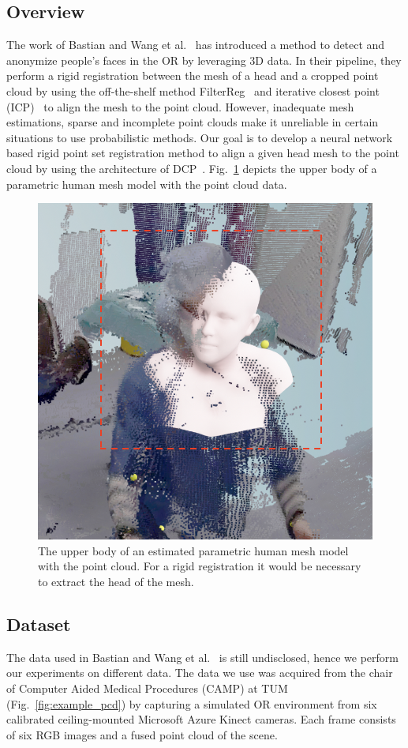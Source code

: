 \documentclass[a4paper,pagesize 10pt]{scrartcl}
\begin{document}
\subsection{Overview}
The work of Bastian and Wang et al.~\cite{disguisor} has introduced a method to detect and anonymize people's faces in the OR by leveraging 3D data.
In their pipeline, they perform a rigid registration between the mesh of a head and a cropped point cloud by using the off-the-shelf method FilterReg~\cite{filterreg} and iterative closest point (ICP)~\cite{icp} to align the mesh to the point cloud. 
However, inadequate mesh estimations, sparse and incomplete point clouds make it unreliable in certain situations to use probabilistic methods.
Our goal is to develop a neural network based rigid point set registration method to align a given head mesh to the point cloud by using the architecture of DCP~\cite{dcp}.
Fig.~\ref{fig:example_mesh} depicts the upper body of a parametric human mesh model with the point cloud data.

\begin{figure}[!ht]
    \centering
    \includegraphics[width=0.65\columnwidth]{figures/issue_pointcloud.png}
    \caption{The upper body of an estimated parametric human mesh model with the point cloud. For a rigid registration it would be necessary to extract the head of the mesh.}
    \label{fig:example_mesh}
\end{figure}

\subsection{Dataset}
The data used in Bastian and Wang et al.~\cite{disguisor} is still undisclosed, hence we perform our experiments on different data.
The data we use was acquired from the chair of Computer Aided Medical Procedures (CAMP) at TUM (Fig.~\ref{fig:example_pcd}) by capturing a simulated OR environment from six calibrated ceiling-mounted Microsoft Azure Kinect cameras.
Each frame consists of six RGB images and a fused point cloud of the scene.
\end{document}
